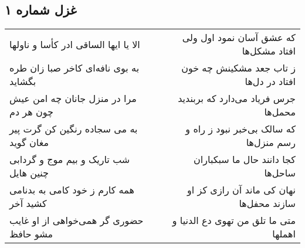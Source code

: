 \begin{center}
\section*{غزل شماره ۱}
\label{sec:sh001}
\begin{longtable}{l p{0.5cm} r}
الا یا ایها الساقی ادر کأسا و ناولها
&&
که عشق آسان نمود اول ولی افتاد مشکل‌ها
\\
به بوی نافه‌ای کاخر صبا زان طره بگشاید
&&
ز تاب جعد مشکینش چه خون افتاد در دل‌ها
\\
مرا در منزل جانان چه امن عیش چون هر دم
&&
جرس فریاد می‌دارد که بربندید محمل‌ها
\\
به می سجاده رنگین کن گرت پیر مغان گوید
&&
که سالک بی‌خبر نبود ز راه و رسم منزل‌ها
\\
شب تاریک و بیم موج و گردابی چنین هایل
&&
کجا دانند حال ما سبکباران ساحل‌ها
\\
همه کارم ز خود کامی به بدنامی کشید آخر
&&
نهان کی ماند آن رازی کز او سازند محفل‌ها
\\
حضوری گر همی‌خواهی از او غایب مشو حافظ
&&
متی ما تلق من تهوی دع الدنیا و اهملها
\\
\end{longtable}
\end{center}
